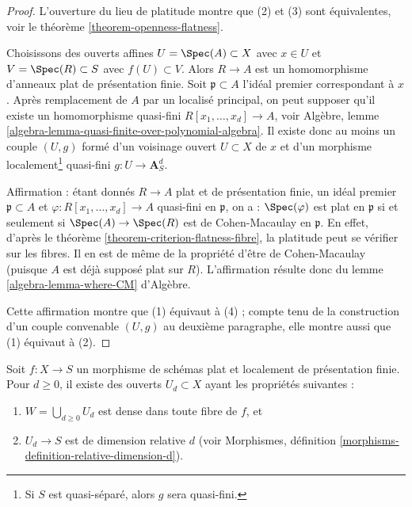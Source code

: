 \begin{proof}
L'ouverture du lieu de platitude montre que (2) et (3)
sont équivalentes, voir le théorème \ref{theorem-openness-flatness}.

\medskip\noindent
Choisissons des ouverts affines $U = \Spec(A) \subset X$ avec $x \in U$ et
$V = \Spec(R) \subset S$ avec $f(U) \subset V$. Alors $R \to A$
est un homomorphisme d'anneaux plat de présentation finie. Soit $\mathfrak p \subset A$
l'idéal premier correspondant à $x$. Après remplacement de $A$ par un
localisé principal, on peut supposer qu'il existe un homomorphisme quasi-fini
$R[x_1, \ldots, x_d]  \to A$, voir
Algèbre, lemme \ref{algebra-lemma-quasi-finite-over-polynomial-algebra}.
Il existe donc au moins un couple $(U, g)$ formé d'un
voisinage ouvert $U \subset X$ de $x$ et d'un morphisme
localement\footnote{Si $S$ est quasi-séparé, alors $g$ sera quasi-fini.} quasi-fini
$g : U \to \mathbf{A}^d_S$.

\medskip\noindent
Affirmation : étant donnés $R \to A$ plat et de présentation finie, un idéal premier
$\mathfrak p \subset A$ et $\varphi : R[x_1, \ldots, x_d] \to A$
quasi-fini en $\mathfrak p$, on a : $\Spec(\varphi)$
est plat en $\mathfrak p$ si et seulement si $\Spec(A) \to \Spec(R)$
est de Cohen-Macaulay en $\mathfrak p$. En effet, d'après le
théorème \ref{theorem-criterion-flatness-fibre},
la platitude peut se vérifier sur les fibres. Il en est de même
de la propriété d'être de Cohen-Macaulay (puisque $A$ est déjà supposé plat sur $R$).
L'affirmation résulte donc du
lemme \ref{algebra-lemma-where-CM} d'Algèbre.

\medskip\noindent
Cette affirmation montre que (1) équivaut à (4) ; compte tenu
de la construction d'un couple convenable $(U, g)$ au deuxième
paragraphe, elle montre aussi que (1) équivaut à (2).
\end{proof}

\begin{lemma}
\label{lemma-flat-finite-presentation-CM-pieces}
Soit $f : X \to S$ un morphisme de schémas plat et localement
de présentation finie. Pour $d \geq 0$, il existe des ouverts $U_d \subset X$
ayant les propriétés suivantes :
\begin{enumerate}
\item $W = \bigcup_{d \geq 0} U_d$ est dense dans toute fibre de $f$, et
\item $U_d \to S$ est de dimension relative $d$ (voir
Morphismes, définition \ref{morphisms-definition-relative-dimension-d}).
\end{enumerate}
\end{lemma}

